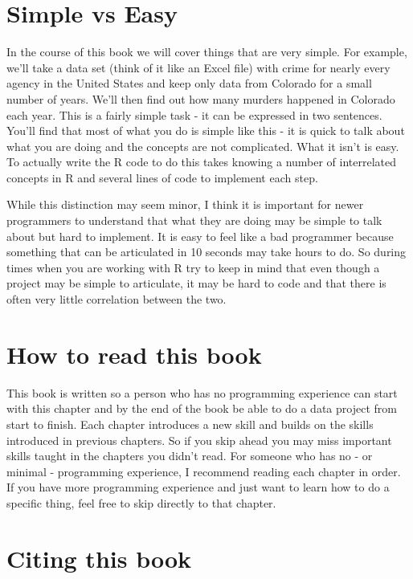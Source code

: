 \documentclass[
]{krantz}
\begin{document}
\hypertarget{simple-vs-easy}{%
\section{Simple vs Easy}\label{simple-vs-easy}}

In the course of this book we will cover things that are very simple. For example, we'll take a data set (think of it like an Excel file) with crime for nearly every agency in the United States and keep only data from Colorado for a small number of years. We'll then find out how many murders happened in Colorado each year. This is a fairly simple task - it can be expressed in two sentences. You'll find that most of what you do is simple like this - it is quick to talk about what you are doing and the concepts are not complicated. What it isn't is easy. To actually write the R code to do this takes knowing a number of interrelated concepts in R and several lines of code to implement each step.

While this distinction may seem minor, I think it is important for newer programmers to understand that what they are doing may be simple to talk about but hard to implement. It is easy to feel like a bad programmer because something that can be articulated in 10 seconds may take hours to do. So during times when you are working with R try to keep in mind that even though a project may be simple to articulate, it may be hard to code and that there is often very little correlation between the two.

\hypertarget{how-to-read-this-book}{%
\section{How to read this book}\label{how-to-read-this-book}}

This book is written so a person who has no programming experience can start with this chapter and by the end of the book be able to do a data project from start to finish. Each chapter introduces a new skill and builds on the skills introduced in previous chapters. So if you skip ahead you may miss important skills taught in the chapters you didn't read. For someone who has no - or minimal - programming experience, I recommend reading each chapter in order. If you have more programming experience and just want to learn how to do a specific thing, feel free to skip directly to that chapter.

\hypertarget{citing-this-book}{%
\section{Citing this book}\label{citing-this-book}}
\end{document}

